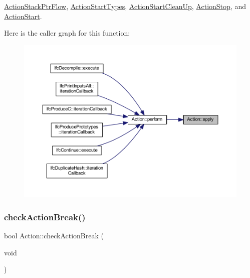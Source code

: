 \mbox{\hyperlink{class_action_stack_ptr_flow_a50ab249d10eef25f05e5e8de38786f7b}{Action\+Stack\+Ptr\+Flow}}, \mbox{\hyperlink{class_action_start_types_a14215a512844751f3199f318f60add40}{Action\+Start\+Types}}, \mbox{\hyperlink{class_action_start_clean_up_a169a82db1316093f0e368a34d2df8538}{Action\+Start\+Clean\+Up}}, \mbox{\hyperlink{class_action_stop_a2d539e33984e982dad5cc306141c9787}{Action\+Stop}}, and \mbox{\hyperlink{class_action_start_a9e21953bb17c18610189c3d28b1ab0a9}{Action\+Start}}.

Here is the caller graph for this function\+:
\nopagebreak
\begin{figure}[H]
\begin{center}
\leavevmode
\includegraphics[width=350pt]{class_action_aac1c3999d6c685b15f5d9765a4d04173_icgraph}
\end{center}
\end{figure}
\mbox{\label{class_action_a81d7c72d8a23e60786cc47fc52d2112f}} 
\subsubsection{\texorpdfstring{checkActionBreak()}{checkActionBreak()}}
{\footnotesize\ttfamily bool Action\+::check\+Action\+Break (\begin{DoxyParamCaption}\item[{void}]{ }\end{DoxyParamCaption})\hspace{0.3cm}{\ttfamily [protected]}}



